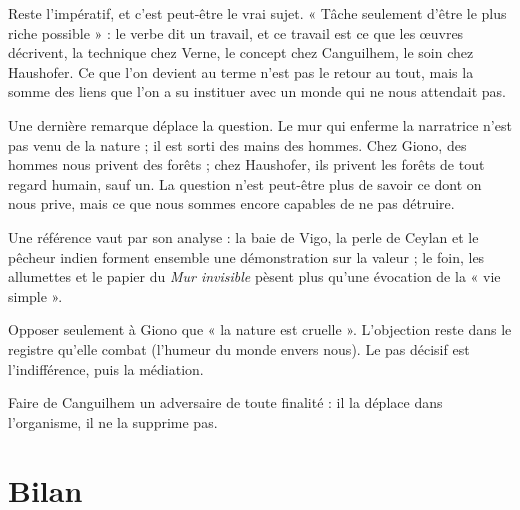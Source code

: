 \documentclass[11pt,a4paper]{article}
\begin{document}
Reste l'impératif, et c'est peut-être le vrai sujet. « Tâche seulement d'être le plus riche possible » : le verbe dit un travail, et ce travail est ce que les œuvres décrivent, la technique chez Verne, le concept chez Canguilhem, le soin chez Haushofer. Ce que l'on devient au terme n'est pas le retour au tout, mais la somme des liens que l'on a su instituer avec un monde qui ne nous attendait pas.

Une dernière remarque déplace la question. Le mur qui enferme la narratrice n'est pas venu de la nature ; il est sorti des mains des hommes. Chez Giono, des hommes nous privent des forêts ; chez Haushofer, ils privent les forêts de tout regard humain, sauf un. La question n'est peut-être plus de savoir ce dont on nous prive, mais ce que nous sommes encore capables de ne pas détruire.

\begin{methode}

Une référence vaut par son analyse : la baie de Vigo, la perle de Ceylan et le pêcheur indien forment ensemble une démonstration sur la valeur ; le foin, les allumettes et le papier du \emph{Mur invisible} pèsent plus qu'une évocation de la « vie simple ».

\end{methode}

\begin{piege}

Opposer seulement à Giono que « la nature est cruelle ». L'objection reste dans le registre qu'elle combat (l'humeur du monde envers nous). Le pas décisif est l'indifférence, puis la médiation.

\end{piege}

\begin{piege}

Faire de Canguilhem un adversaire de toute finalité : il la déplace dans l'organisme, il ne la supprime pas.

\end{piege}

\hypertarget{bilan}{%
\section{Bilan}\label{bilan}}
\end{document}

